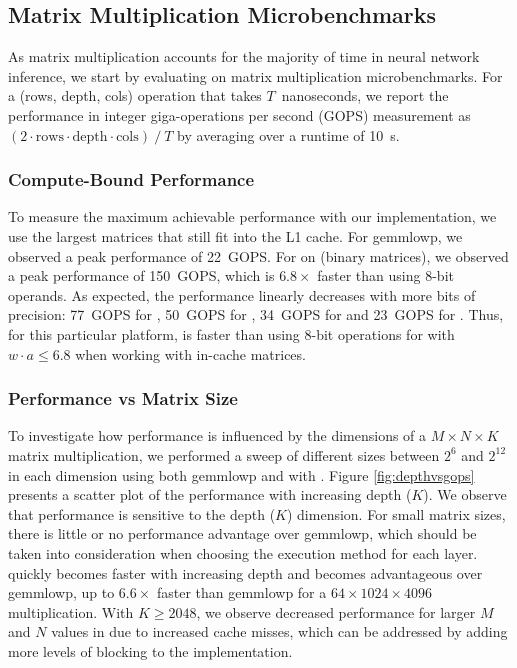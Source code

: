 \documentclass[sigconf]{acmart}
\begin{document}
\subsection{Matrix Multiplication Microbenchmarks}
As matrix multiplication accounts for the majority of time in neural network inference, we start by evaluating \ours{} on matrix multiplication microbenchmarks.
For a (rows, depth, cols) operation that takes $T$~nanoseconds, we report the performance in integer giga-operations per second (GOPS) measurement as $(2\cdot\mathrm{rows}\cdot\mathrm{depth}\cdot\mathrm{cols}) \mathrel{/} T$ by averaging over a runtime of 10~s.

\subsubsection{Compute-Bound Performance}
\label{sec:peakperf}
To measure the maximum achievable performance with our implementation, we use the largest matrices that still fit into the L1 cache.
For gemmlowp, we observed a peak performance of 22~GOPS.
For \ours{} on  (binary matrices), we observed a peak performance of 150~GOPS, which is $6.8\times$ faster than using 8-bit operands.
As expected, the performance linearly decreases with more bits of precision: 77~GOPS for , 50~GOPS for , 34~GOPS for  and 23~GOPS for .
Thus, for this particular platform, \ours{} is faster than using 8-bit operations for  with $w \cdot a \leq 6.8$ when working with in-cache matrices.

\subsubsection{Performance vs Matrix Size}
\label{sec:perfvssize}
To investigate how performance is influenced by the dimensions of a $M \times N \times K$ matrix multiplication, we performed a sweep of different sizes between $2^6$ and $2^{12}$ in each dimension using both gemmlowp and \ours{} with .
Figure \ref{fig:depthvsgops} presents a scatter plot of the performance with increasing depth ($K$).
We observe that \ours{} performance is sensitive to the depth ($K$) dimension.
For small matrix sizes, there is little or no performance advantage over gemmlowp, which should be taken into consideration when choosing the execution method for each layer.
\ours{} quickly becomes faster with increasing depth and becomes advantageous over gemmlowp, up to $6.6\times$ faster than gemmlowp for a $64 \times 1024 \times 4096$ multiplication.
With $K \geq 2048$, we observe decreased performance for larger $M$ and $N$ values in \ours{} due to increased cache misses, which can be addressed by adding more levels of blocking to the implementation.
\end{document}
